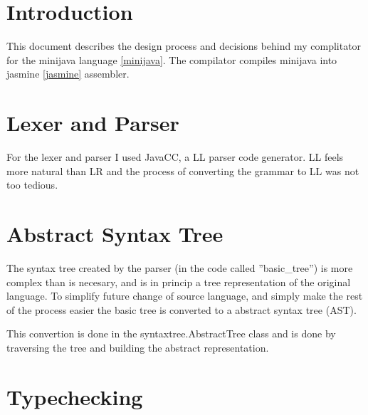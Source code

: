 \section{Introduction}
This document describes the design process and decisions behind my complitator for the minijava language \ref{minijava}. The compilator compiles minijava into jasmine \ref{jasmine} assembler.

\section{Lexer and Parser}
For the lexer and parser I used JavaCC, a LL parser code generator. LL feels more natural than LR and the process of converting the grammar to LL was not too tedious.

\section{Abstract Syntax Tree}
The syntax tree created by the parser (in the code called ''basic\_tree'') is more complex than
is necesary, and is in princip a tree representation of the original language. To simplify future change of source language, and simply make the rest of the process easier the basic tree is
converted to a abstract syntax tree (AST).

This convertion is done in the syntaxtree.AbstractTree class and is done by traversing the tree
and building the abstract representation.

\section{Typechecking}

